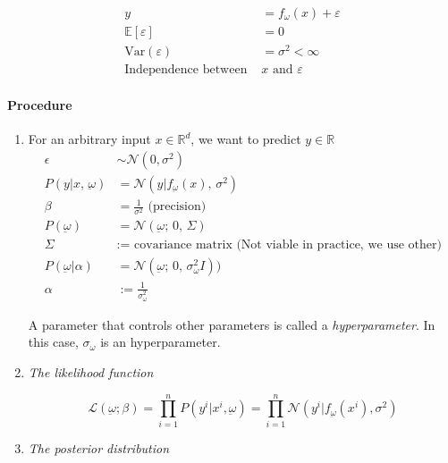 \begin{align*}
  y &= f_\omega(x) + \varepsilon \\
  \mathds{E}[\varepsilon] &= 0 \\
  \text{Var}(\varepsilon) &= \sigma^2 < \infty \\
  \text{Independence between }& x \text{ and }\varepsilon
\end{align*}

\paragraph{Procedure}

\begin{enumerate}
	\item For an arbitrary input \(x \in \mathds{R}^d\), we want to predict
	      \(y \in \mathds{R}\)
	      \begin{align*}
		      \epsilon                      & \sim \mathcal{N}(0, \sigma^2)                                       \\
		      P(y | x,\, \underbar{\omega})   & = \mathcal{N}(y | f_{\underbar{\omega}}(x),\, \sigma^2)               \\
		      \beta                         & = \frac{1}{\sigma^2} \text{ (precision)}                            \\
		      P(\underbar{\omega})          & = \mathcal{N}(\underbar{\omega} ;\, 0 ,\, \Sigma)                       \\
		      \Sigma                        & := \text{ covariance matrix (Not viable in practice, we use other)} \\
		      P(\underbar{\omega} | \alpha) & = \mathcal{N}(\underbar{\omega} ;\, 0 ,\,\sigma_{\omega}^2 I))         \\
		      \alpha                        & := \frac{1}{\sigma_{\omega}^2}
	      \end{align*}

	      A parameter that controls other parameters is called a
	      \emph{hyperparameter}. In this case, \(\sigma_\omega\) is an
	      hyperparameter.

	\item \emph{The likelihood function}

	      \[
		      \mathcal{L}(\underbar{\omega} ; \beta) = \prod_{i=1}^n P(y^i | x^i, \underbar{\omega}) =
		      \prod_{i=1}^n \mathcal{N}(y^i | f_{\underbar{\omega}}(x^i), \sigma^2)
	      \]

	\item \emph{The posterior distribution}
\end{enumerate}

